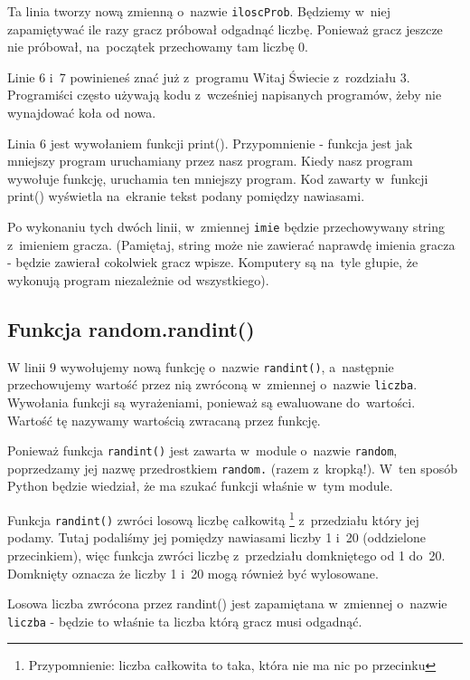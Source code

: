 \documentclass{book}
\begin{document}
Ta linia tworzy nową zmienną o~nazwie \lstinline{iloscProb}. Będziemy w~niej zapamiętywać ile razy gracz próbował odgadnąć liczbę. Ponieważ gracz jeszcze nie próbował, na~początek przechowamy tam liczbę 0.



Linie 6 i~7 powinieneś znać już z~programu Witaj Świecie z~rozdziału 3. Programiści często używają kodu z~wcześniej napisanych programów, żeby nie wynajdować koła od nowa.

Linia 6 jest wywołaniem funkcji print(). Przypomnienie - funkcja jest jak mniejszy program uruchamiany przez nasz program. Kiedy nasz program wywołuje funkcję, uruchamia ten mniejszy program. Kod zawarty w~funkcji print() wyświetla na~ekranie tekst podany pomiędzy nawiasami.

Po wykonaniu tych dwóch linii, w~zmiennej \lstinline{imie} będzie przechowywany string z~imieniem gracza. (Pamiętaj, string może nie zawierać naprawdę imienia gracza - będzie zawierał cokolwiek gracz wpisze. Komputery są na~tyle głupie, że wykonują program niezależnie od wszystkiego).

\subsection{Funkcja random.randint()}



W linii 9 wywołujemy nową  funkcję o~nazwie \lstinline{randint()}, a~następnie przechowujemy wartość przez nią zwróconą w~zmiennej o~nazwie \lstinline{liczba}. Wywołania funkcji są wyrażeniami, ponieważ są ewaluowane do~wartości. Wartość tę nazywamy wartością zwracaną przez funkcję.

Ponieważ funkcja \lstinline{randint()} jest zawarta w~module o~nazwie \lstinline{random}, poprzedzamy jej nazwę przedrostkiem \lstinline{random.} (razem z~kropką!). W~ten sposób Python będzie wiedział, że ma szukać funkcji właśnie w~tym module.

Funkcja \lstinline{randint()} zwróci losową liczbę całkowitą \footnote{Przypomnienie: liczba całkowita to taka, która nie ma nic po przecinku} z~przedziału który jej podamy. Tutaj podaliśmy jej pomiędzy nawiasami liczby 1 i~20 (oddzielone przecinkiem), więc funkcja zwróci liczbę z~przedziału domkniętego od 1 do~20. Domknięty oznacza że liczby 1 i~20 mogą również być wylosowane. 

Losowa liczba zwrócona przez randint() jest zapamiętana w~zmiennej o~nazwie \lstinline{liczba} - będzie to właśnie ta liczba którą gracz musi odgadnąć.
\end{document}
